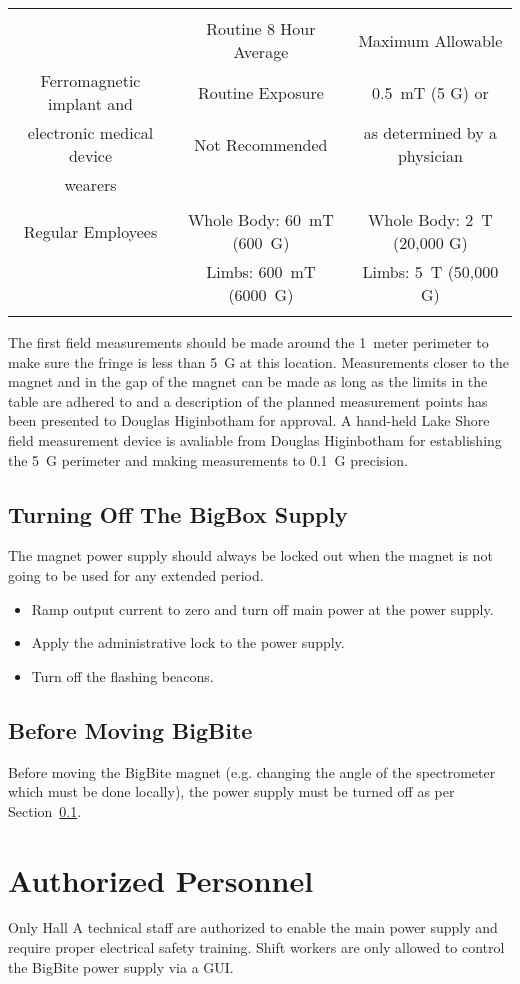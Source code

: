 {\tiny
\begin{tabular}{ccc}
				& & \\
	& Routine 8 Hour Average & Maximum Allowable \\
Ferromagnetic implant and & Routine Exposure & 0.5~mT (5 G) or \\
electronic medical device & Not Recommended  & as determined by a physician \\
wearers                   & &  \\
				& & \\
Regular Employees	& Whole Body: 60~mT (600~G)     & Whole Body: 2~T (20,000 G) \\  
	                & Limbs: 600~mT (6000~G)	& Limbs: 5~T (50,000 G) \\
				& & \\
\end{tabular}
}

The first field measurements should be made around the 1~meter perimeter to make sure the fringe is less than 5~G at
this location.  Measurements closer to the magnet and in the gap of the magnet can
be made as long as the limits in the table are adhered to and a description of the planned measurement points
has been presented to Douglas Higinbotham for approval.
A hand-held Lake Shore field measurement device is avaliable from Douglas Higinbotham 
for establishing the 5~G perimeter
and making measurements to 0.1~G precision.


\subsection{Turning Off The BigBox Supply}
\label{off}

The magnet power supply should always be locked out when the magnet is not going 
to be used for any extended period.

\begin{itemize}
\item{Ramp output current to zero and turn off main power at the power supply.}
\item{Apply the administrative lock to the power supply.}
\item{Turn off the flashing beacons.}
\end{itemize}

\subsection{Before Moving BigBite}

Before moving the BigBite magnet (e.g. changing the angle of the spectrometer which must
be done locally), the power supply must be turned off as per Section~\ref{off}.   

\clearpage
\section{Authorized Personnel}

Only Hall A technical staff are authorized to enable the main power supply and require
proper electrical safety training.  Shift workers are only allowed to control 
the BigBite power supply via a GUI.  


